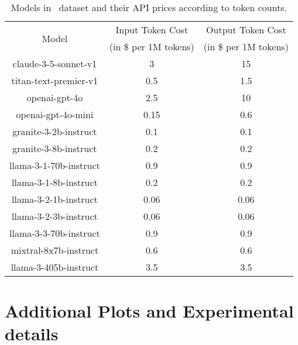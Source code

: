 


\begin{table}
    \centering
    \caption{Models in \newdata\ dataset and their API prices according to token counts.}
    \begin{tabular}{c c c } 
 \toprule
 \multirow{2}{*}{Model} & Input Token Cost & Output Token Cost\\
 & (in \$ per 1M tokens) & (in \$ per 1M tokens)\\
 \hline\hline
 claude-3-5-sonnet-v1 & 3 & 15  \\ 
 \hline
 titan-text-premier-v1 & 0.5 & 1.5  \\
 \hline
 openai-gpt-4o & 2.5 & 10  \\
 \hline
 openai-gpt-4o-mini & 0.15 & 0.6  \\
 \hline
 granite-3-2b-instruct & 0.1 & 0.1  \\ 
 \hline
 granite-3-8b-instruct & 0.2 & 0.2  \\
 \hline
 llama-3-1-70b-instruct & 0.9 & 0.9  \\ 
 \hline
 llama-3-1-8b-instruct & 0.2 & 0.2  \\ 
 \hline
  llama-3-2-1b-instruct & 0.06 & 0.06  \\ 
 \hline
 llama-3-2-3b-instruct & 0.06 & 0.06  \\ 
 \hline
 llama-3-3-70b-instruct & 0.9 & 0.9  \\ 
 \hline
 mixtral-8x7b-instruct & 0.6 & 0.6  \\ 
 \hline
 llama-3-405b-instruct & 3.5 & 3.5  \\ 
 \bottomrule
\end{tabular}
    \label{tab:price_by_token_newdata}
\end{table}







\section{Additional Plots and Experimental details}
